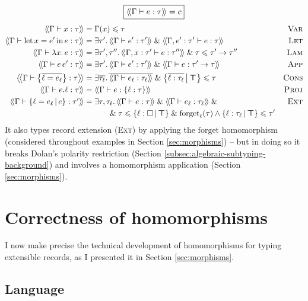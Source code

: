 $$ \boxed{\cstr{\Gamma}{e}{\tau} = c} $$
\begin{align*}
\cstr{\Gamma}{x}{\tau} &= \Gamma(x) \sub \tau 
&\textsc{Var} \\
\cstr{\Gamma}{\fllet{x}{e'}{e}}{\tau} &= \exists \tau' \ldotp \cstr{\Gamma}{e'}{\tau'} \und \cstr{\Gamma, e' : \tau'}{e}{\tau}
&\textsc{Let} \\
\cstr{\Gamma}{\fllam x e}{\tau} &= \exists \tau', \tau'' \ldotp \cstr{\Gamma, x : \tau'}{e}{\tau''} \und \tau \sub \tau' \to \tau''
&\textsc{Lam} \\
\cstr{\Gamma}{e\,e'}{\tau} &= \exists \tau' \ldotp \cstr{\Gamma}{e'}{\tau'} \und \cstr{\Gamma}{e}{\tau' \to \tau}
&\textsc{App} \\
\cstr{\Gamma}{\flrec{\overline{\ell = e_\ell}}}{\tau} &= \exists \overline{\tau_\ell} \ldotp \overline{\cstr{\Gamma}{e_\ell}{\tau_\ell}} \und \flext{\overline{\ell : \tau_\ell}}{\flftop} \sub \tau
&\textsc{Cons} \\
\cstr{\Gamma}{\sproj{e}{\ell}}{\tau} &= \cstr{\Gamma}{e}{\srecordtype{\ell : \tau}}
&\textsc{Proj} \\
\cstr{\Gamma}{\flext{\ell = e_\ell}{e}}{\tau'} &= \exists \tau, \tau_\ell \ldotp \cstr{\Gamma}{e}{\tau} \und \cstr{\Gamma}{e_\ell}{\tau_\ell} \und &\textsc{Ext} \\ 
&\qquad\quad\und \tau \sub \flext{\ell : \flabsent}{\flftop} \und \mathrm{forget}_\ell(\tau) \meet \flext{\ell : \tau_\ell}{\flftop} \sub \tau' &
\end{align*}
It also types record extension (\textsc{Ext}) by applying the $\mathrm{forget}$ homomorphism (considered throughout examples in Section \ref{sec:morphisms}) -- but in doing so it breaks Dolan's polarity restriction (Section \ref{subsec:algebraic-subtyping-background}) and involves a homomorphism application (Section \ref{sec:morphisms}).

\section{Correctness of homomorphisms}

I now make precise the technical development of homomorphisms for typing extensible records, as I presented it in Section \ref{sec:morphisms}.

\subsection{Language}

